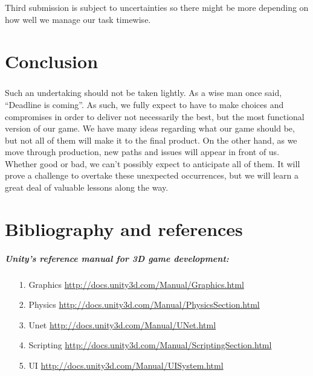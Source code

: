 \paragraph{} Third submission is subject to uncertainties so there might be more depending on how well we manage our task timewise.


\chapter{Conclusion}

\paragraph{}Such an undertaking should not be taken lightly. As a wise man once said, “Deadline is coming”. As such, we fully expect to have to make choices and compromises in order to deliver not necessarily the best, but the most functional version of our game. We have many ideas regarding what our game should be, but not all of them will make it to the final product. On the other hand, as we move through production, new paths and issues will appear in front of us. Whether good or bad, we can’t possibly expect to anticipate all of them. It will prove a challenge to overtake these unexpected occurrences, but we will learn a great deal of valuable lessons along the way.


\chapter{Bibliography and references}

\paragraph{\bfseries Unity's reference manual for 3D game development:}

\begin{itemize}
    \item[1.]{Graphics}{ \url{http://docs.unity3d.com/Manual/Graphics.html}}
    \item[2.]{Physics}{ \url{http://docs.unity3d.com/Manual/PhysicsSection.html}}
    \item[3.]{Unet}{ \url{http://docs.unity3d.com/Manual/UNet.html}}
    \item[4.]{Scripting}{ \url{http://docs.unity3d.com/Manual/ScriptingSection.html}}
    \item[5.]{UI}{ \url{http://docs.unity3d.com/Manual/UISystem.html}}
\end{itemize}

